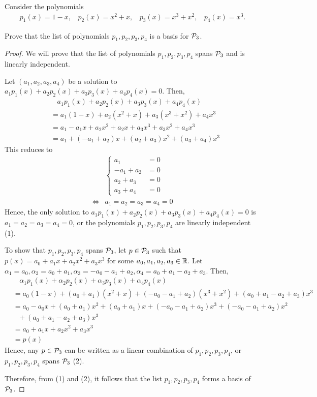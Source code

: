 \begin{question}
    \normalfont

    Consider the polynomials
    \begin{align*}
        p_1(x) = 1-x,\ \ \ \ p_2(x)=x^2+x,\ \ \ \ p_3(x)=x^3+x^2,\ \ \ \ p_4(x)=x^3.
    \end{align*}

    Prove that the list of polynomials $p_1, p_2, p_3, p_4$ \hspace{.1cm} is a basis for $\P_3$.


\end{question}

\begin{proof}
    We will prove that the list of polynomials $p_1,p_2,p_3,p_4$ spans $\P_3$ and is linearly independent.

    Let $(a_1,a_2,a_3,a_4)$ be a solution to $a_1p_1(x)+a_2p_2(x)+a_3p_3(x)+a_4p_4(x)=0$. Then, 
    \[
        \begin{aligned}
            &\ \ \ \ a_1p_1(x)+a_2p_2(x)+a_3p_3(x)+a_4p_4(x)\\
            &= a_1(1-x)+a_2(x^2+x)+a_3(x^3+x^2)+a_4x^3\\
            &= a_1-a_1x+a_2x^2+a_2x+a_3x^3+a_3x^2+a_4x^3\\
            &= a_1+(-a_1+a_2)x+(a_2+a_3)x^2+(a_3+a_4)x^3
        \end{aligned}
    \]
    This reduces to 
    \begin{align*}
        &\begin{cases}
            a_1      &= 0\\
            -a_1+a_2 &= 0\\
            a_2+a_3  &= 0\\
            a_3+a_4  &= 0
        \end{cases}\\\iff
        &a_1=a_2=a_3=a_4=0 
    \end{align*}
    Hence, the only solution to $a_1p_1(x)+a_2p_2(x)+a_3p_3(x)+a_4p_4(x)=0$ is $a_1=a_2=a_3=a_4=0$, or the polynomials $p_1,p_2,p_3,p_4$ are linearly independent (1).

    To show that $p_1,p_2,p_3,p_4$ spans $\P_3$, let $p\in\P_3$ such that $p(x)=a_0+a_1x+a_2x^2+a_3x^3$ for some $a_0,a_1,a_2,a_3\in\R$. Let $\alpha_1=a_0,\alpha_2=a_0+a_1,\alpha_3=-a_0-a_1+a_2,\alpha_4=a_0+a_1-a_2+a_3$. Then, 
    \[
        \begin{aligned}
            &\ \ \ \ \alpha_1p_1(x)+\alpha_2p_2(x)+\alpha_3p_3(x)+\alpha_4p_4(x)\\
            &= a_0(1-x)+(a_0+a_1)(x^2+x)+(-a_0-a_1+a_2)(x^3+x^2)+(a_0+a_1-a_2+a_3)x^3\\
            &= a_0-a_0x+(a_0+a_1)x^2+(a_0+a_1)x+(-a_0-a_1+a_2)x^3+(-a_0-a_1+a_2)x^2\\
            &\ \ \ +(a_0+a_1-a_2+a_3)x^3\\
            &= a_0+a_1x+a_2x^2+a_3x^3\\
            &=p(x)
        \end{aligned}
    \]
    Hence, any $p\in\P_3$ can be written as a linear combination of $p_1,p_2,p_3,p_4$, or $p_1,p_2,p_3,p_4$ spans $\P_3$ (2).

    Therefore, from (1) and (2), it follows that the list $p_1,p_2,p_3,p_4$ forms a basis of $\P_3$.
\end{proof}